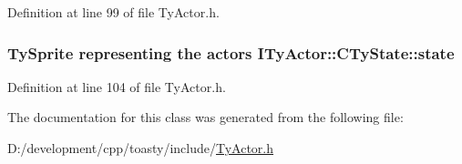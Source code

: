 Definition at line 99 of file TyActor.h.

\hypertarget{class_i_ty_actor_1_1_c_ty_state_ad744ea8266eddb703ed954daa1c3194b}{
\subsubsection[{state}]{ TySprite representing the actors {\bf ITyActor::CTyState::state}}}
\label{class_i_ty_actor_1_1_c_ty_state_ad744ea8266eddb703ed954daa1c3194b}


Definition at line 104 of file TyActor.h.



The documentation for this class was generated from the following file:\begin{DoxyCompactItemize}
\item 
D:/development/cpp/toasty/include/\hyperlink{_ty_actor_8h}{TyActor.h}\end{DoxyCompactItemize}
